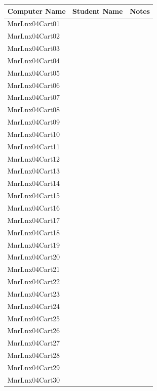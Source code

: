 \begin{tabular}{| l | p{7cm} | p{5cm} |}
        \hline
        \textbf{Computer Name} & \textbf{Student Name} & \textbf{Notes}\\ \hline
        MnrLnx04Cart01 & & \\ \hline
        MnrLnx04Cart02 & & \\ \hline
        MnrLnx04Cart03 & & \\ \hline
        MnrLnx04Cart04 & & \\ \hline
        MnrLnx04Cart05 & & \\ \hline
        MnrLnx04Cart06 & & \\ \hline
        MnrLnx04Cart07 & & \\ \hline
        MnrLnx04Cart08 & & \\ \hline
        MnrLnx04Cart09 & & \\ \hline
        MnrLnx04Cart10 & & \\ \hline
        MnrLnx04Cart11 & & \\ \hline
        MnrLnx04Cart12 & & \\ \hline
        MnrLnx04Cart13 & & \\ \hline
        MnrLnx04Cart14 & & \\ \hline
        MnrLnx04Cart15 & & \\ \hline
        MnrLnx04Cart16 & & \\ \hline
        MnrLnx04Cart17 & & \\ \hline
        MnrLnx04Cart18 & & \\ \hline
        MnrLnx04Cart19 & & \\ \hline
        MnrLnx04Cart20 & & \\ \hline
        MnrLnx04Cart21 & & \\ \hline
        MnrLnx04Cart22 & & \\ \hline
        MnrLnx04Cart23 & & \\ \hline
        MnrLnx04Cart24 & & \\ \hline
        MnrLnx04Cart25 & & \\ \hline
        MnrLnx04Cart26 & & \\ \hline
        MnrLnx04Cart27 & & \\ \hline
        MnrLnx04Cart28 & & \\ \hline
        MnrLnx04Cart29 & & \\ \hline
        MnrLnx04Cart30 & & \\ \hline
\end{tabular}
